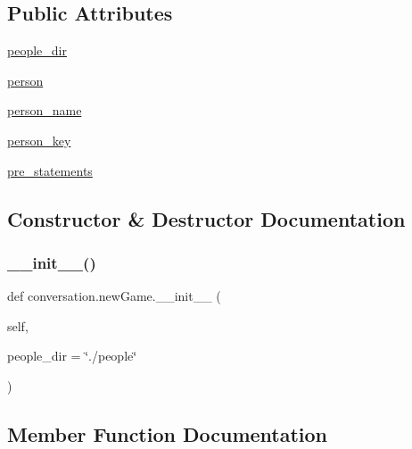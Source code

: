 \subsection*{Public Attributes}
\begin{DoxyCompactItemize}
\item 
\hyperlink{classconversation_1_1newGame_aa8aabb7fa9c730278df1a6a2ae901e8b}{people\+\_\+dir}
\item 
\hyperlink{classconversation_1_1newGame_a901ab061590de820eeac91516fd614cb}{person}
\item 
\hyperlink{classconversation_1_1newGame_a1c07502ad32bb547e1896104e6909db8}{person\+\_\+name}
\item 
\hyperlink{classconversation_1_1newGame_a70ed99d3ca06ac8696c2189e7957dbd8}{person\+\_\+key}
\item 
\hyperlink{classconversation_1_1newGame_a8efe0b5a5cd745b5a7ee26c3d01caa78}{pre\+\_\+statements}
\end{DoxyCompactItemize}


\subsection{Constructor \& Destructor Documentation}
\mbox{\label{classconversation_1_1newGame_a5f61c963f551487b736182fc84feef03}} 
\subsubsection{\texorpdfstring{\+\_\+\+\_\+init\+\_\+\+\_\+()}{\_\_init\_\_()}}
{\footnotesize\ttfamily def conversation.\+new\+Game.\+\_\+\+\_\+init\+\_\+\+\_\+ (\begin{DoxyParamCaption}\item[{}]{self,  }\item[{}]{people\+\_\+dir = {\ttfamily \char`\"{}./people\char`\"{}} }\end{DoxyParamCaption})}



\subsection{Member Function Documentation}
\mbox{\label{classconversation_1_1newGame_a0bb04ae61ad03864ab0d42c991448909}} 
